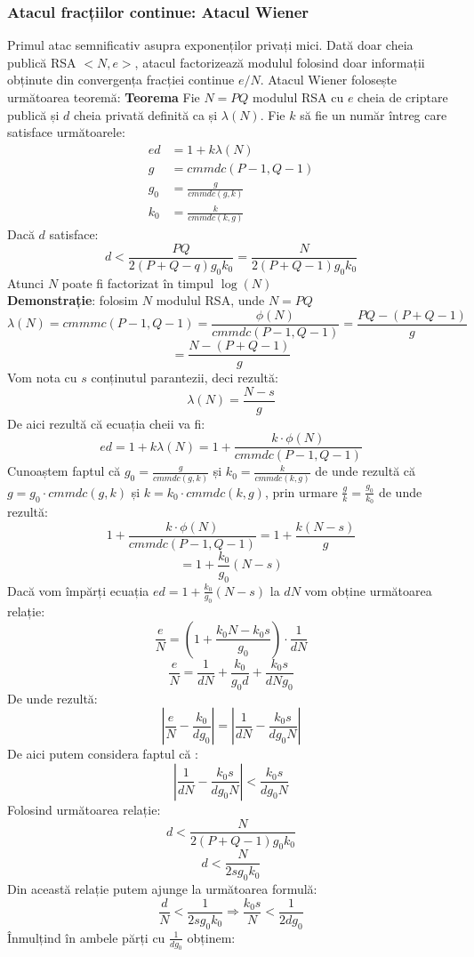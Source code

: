 \documentclass[12]{report}
\begin{document}
\subsubsection{Atacul fracțiilor continue: Atacul Wiener}
Primul atac semnificativ asupra exponenților privați mici. Dată doar cheia publică RSA $<N,e>$, atacul factorizează modulul folosind doar informații obținute din convergența fracției continue $e/N$. Atacul Wiener folosește următoarea teoremă:
\textbf{Teorema} Fie $N=PQ$ modulul RSA cu $e$ cheia de criptare publică și $d$ cheia privată definită ca și $\lambda(N)$. Fie $k$ să fie un număr întreg care satisface următoarele:
\begin{align*}
ed&=1+k \lambda(N) \\
g&=cmmdc(P-1,Q-1) \\
g_0&=\frac{g}{cmmdc(g,k)} \\
k_0&=\frac{k}{cmmdc(k,g)}
\end{align*}
Dacă $d$ satisface:
$$ d< \frac{PQ}{2(P+Q-q)g_0k_0} = \frac{N}{2(P+Q-1)g_0k_0}$$
Atunci $N$ poate fi factorizat în timpul $\log(N)$ \\
\textbf{Demonstrație}: folosim $N$ modulul RSA, unde $N=PQ$
$$ \lambda(N)=cmmmc(P-1,Q-1)=\frac{\phi(N)}{cmmdc(P-1,Q-1)}=\frac{PQ - (P+Q-1)}{g}$$
$$ = \frac{N - (P+Q-1)}{g}$$
Vom nota cu $s$ conținutul parantezii, deci rezultă:
$$ \lambda(N) = \frac{N-s}{g}$$
De aici rezultă că ecuația cheii va fi:
$$ed = 1 +k \lambda(N)= 1+ \frac{k \cdot  \phi(N)}{cmmdc(P-1,Q-1)} $$
Cunoaștem faptul că  $g_0 = \frac{g}{cmmdc(g,k)}$ și $k_0=\frac{k}{cmmdc(k,g)}$ de unde rezultă că $g=g_0 \cdot   cmmdc(g,k)$ și $k=k_0 \cdot   cmmdc(k,g)$, prin urmare $\frac{g}{k} = \frac{g_0}{k_0}$ de unde rezultă:
$$ 1+ \frac{k \cdot  \phi(N)}{cmmdc(P-1,Q-1)} = 1+ \frac{k (N-s)}{g} $$
$$ = 1+ \frac{k_0}{g_0} (N-s)$$
Dacă vom împărți ecuația $ed= 1+ \frac{k_0}{g_0} (N-s)$ la $dN$ vom obține următoarea relație:
$$ \frac{e}{N} = \left(  1+ \frac{k_0N - k_0s}{g_0}   \right) \cdot   \frac{1}{dN} $$
$$ \frac{e}{N} = \frac{1}{dN} + \frac{k_0}{g_0 d} +\frac{k_0s}{dNg_0}$$
De unde rezultă:
$$ \left |  \frac{e}{N} - \frac{k_0}{dg_0} \right| = \left| \frac{1}{dN} - \frac{k_0s}{dg_0N} \right| $$
De aici putem considera faptul că :
$$ \left| \frac{1}{dN} - \frac{k_0s}{dg_0N} \right| < \frac{k_0s}{dg_0N}$$
Folosind următoarea relație:
$$ d< \frac{N}{2(P+Q-1)g_0k_0}  $$
$$ d < \frac{N}{2sg_0k_0}$$
Din această relație putem ajunge la următoarea formulă:
$$ \frac{d}{N} < \frac{1}{2sg_0k_0} \Rightarrow \frac{k_0s}{N} < \frac{1}{2dg_0}$$
Înmulțind în ambele părți cu $\frac{1}{dg_0}$ obținem:
\end{document}
